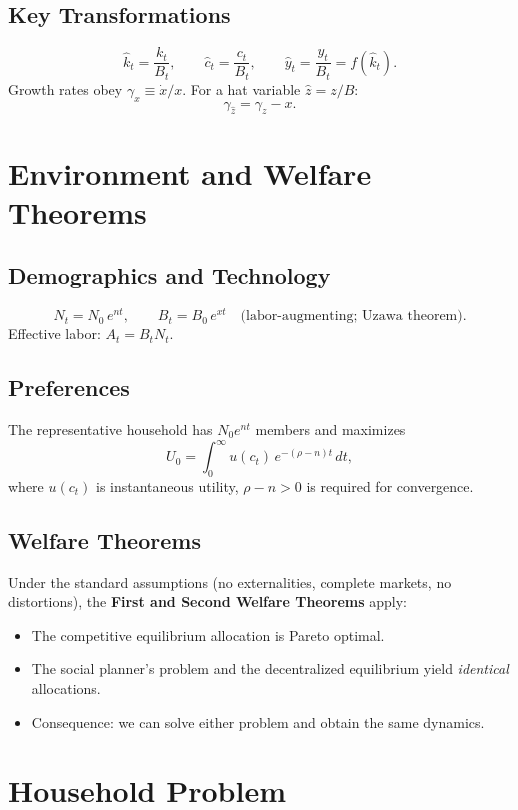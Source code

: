 \documentclass[a4paper,11pt]{article}
\newcommand{\khat}{\hat{k}}
\newcommand{\chat}{\hat{c}}
\newcommand{\yhat}{\hat{y}}
\begin{document}
\subsection*{Key Transformations}
\[
  \khat_t = \frac{k_t}{B_t}, \qquad
  \chat_t = \frac{c_t}{B_t}, \qquad
  \yhat_t = \frac{y_t}{B_t} = f(\khat_t).
\]
Growth rates obey $\gamma_x \equiv \dot{x}/x$. For a hat variable $\hat{z} = z/B$:
\[
  \gamma_{\hat{z}} = \gamma_z - x.
\]

\section{Environment and Welfare Theorems}

\subsection*{Demographics and Technology}
\[
  N_t = N_0 \, e^{nt}, \qquad B_t = B_0 \, e^{xt} \quad \text{(labor-augmenting; Uzawa theorem)}.
\]
Effective labor: $A_t = B_t N_t$.

\subsection*{Preferences}
The representative household has $N_0 e^{nt}$ members and maximizes
\[
  U_0 = \int_0^{\infty} u(c_t)\, e^{-(\rho - n)t}\, dt,
\]
where $u(c_t)$ is instantaneous utility, $\rho - n > 0$ is required for convergence.

\subsection*{Welfare Theorems}
Under the standard assumptions (no externalities, complete markets, no distortions), the \textbf{First and Second Welfare Theorems} apply:
\begin{itemize}[leftmargin=*]
  \item The competitive equilibrium allocation is Pareto optimal.
  \item The social planner's problem and the decentralized equilibrium yield \emph{identical} allocations.
  \item Consequence: we can solve either problem and obtain the same dynamics.
\end{itemize}

\section{Household Problem}
\end{document}
